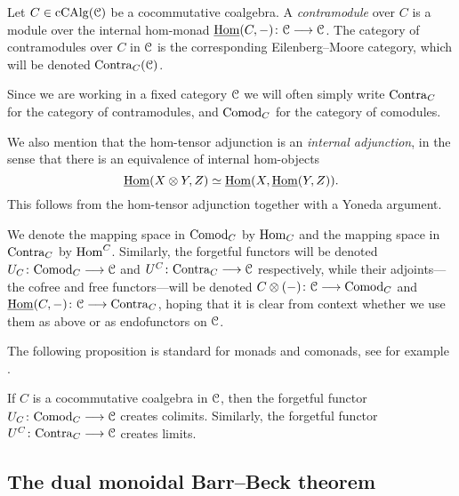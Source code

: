 \begin{definition}
    Let $C\in \operatorname{cCAlg}(\EuScript{C})$ be a cocommutative coalgebra. A \emph{contramodule} over $C$ is a module over the internal hom-monad $\operatorname{\underline{Hom}}(C,-)\colon\EuScript{C}\longrightarrow \EuScript{C}$. The category of contramodules over $C$ in $\EuScript{C}$ is the corresponding Eilenberg--Moore category, which will be denoted $\mathrm{Contra}_C(\EuScript{C})$. 
\end{definition}

\begin{notation}
    Since we are working in a fixed category $\EuScript{C}$ we will often simply write $\mathrm{Contra}_C$ for the category of contramodules, and $\mathrm{Comod}_C$ for the category of comodules. 
\end{notation}

\begin{remark}
    \label{ch2:rm:internal-adjunction}
    We also mention that the hom-tensor adjunction is an \emph{internal adjunction}, in the sense that there is an equivalence of internal hom-objects 
    \[\operatorname{\underline{Hom}}(X\otimes Y, Z) \simeq \operatorname{\underline{Hom}}(X, \operatorname{\underline{Hom}}(Y, Z)).\]
    This follows from the hom-tensor adjunction together with a Yoneda argument. 
\end{remark}

\begin{notation}
    We denote the mapping space in $\mathrm{Comod}_C$ by $\operatorname{Hom}_C$ and the mapping space in $\mathrm{Contra}_C$ by $\operatorname{Hom}^C$. Similarly, the forgetful functors will be denoted $U_C\colon\mathrm{Comod}_C\longrightarrow \EuScript{C}$ and $U^C\colon \mathrm{Contra}_C\longrightarrow \EuScript{C}$ respectively, while their adjoints---the cofree and free functors---will be denoted $C\otimes (-)\colon\EuScript{C}\longrightarrow \mathrm{Comod}_C$ and $\operatorname{\underline{Hom}}(C, -)\colon \EuScript{C}\longrightarrow \mathrm{Contra}_C$, hoping that it is clear from context whether we use them as above or as endofunctors on $\EuScript{C}$.
\end{notation}

The following proposition is standard for monads and comonads, see for example \cite[5.7]{riehl-verity_2015}. 

\begin{proposition}
    If $C$ is a cocommutative coalgebra in $\EuScript{C}$, then the forgetful functor $U_C\colon\mathrm{Comod}_C\longrightarrow \EuScript{C}$ creates colimits. Similarly, the forgetful functor $U^C\colon\mathrm{Contra}_C\longrightarrow \EuScript{C}$ creates limits. 
\end{proposition}







\subsection{The dual monoidal Barr--Beck theorem}
\label{ch2:ssec:dual-barr-beck}


